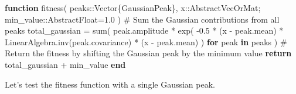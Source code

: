 \documentclass[
]{scrartcl}
\newenvironment{Shaded}{\begin{snugshade}}{\end{snugshade}}
\newcommand{\BuiltInTok}[1]{\textcolor[rgb]{0.00,0.23,0.31}{#1}}
\newcommand{\CharTok}[1]{\textcolor[rgb]{0.13,0.47,0.30}{#1}}
\newcommand{\CommentTok}[1]{\textcolor[rgb]{0.37,0.37,0.37}{#1}}
\newcommand{\ControlFlowTok}[1]{\textcolor[rgb]{0.00,0.23,0.31}{\textbf{#1}}}
\newcommand{\DataTypeTok}[1]{\textcolor[rgb]{0.68,0.00,0.00}{#1}}
\newcommand{\FloatTok}[1]{\textcolor[rgb]{0.68,0.00,0.00}{#1}}
\newcommand{\FunctionTok}[1]{\textcolor[rgb]{0.28,0.35,0.67}{#1}}
\newcommand{\KeywordTok}[1]{\textcolor[rgb]{0.00,0.23,0.31}{\textbf{#1}}}
\newcommand{\NormalTok}[1]{\textcolor[rgb]{0.00,0.23,0.31}{#1}}
\newcommand{\OperatorTok}[1]{\textcolor[rgb]{0.37,0.37,0.37}{#1}}
\begin{document}
\begin{Shaded}
\begin{Highlighting}[]
\KeywordTok{function} \FunctionTok{fitness}\NormalTok{(}
\NormalTok{    peaks}\OperatorTok{::}\DataTypeTok{Vector\{GaussianPeak\}}\NormalTok{,}
\NormalTok{    x}\OperatorTok{::}\DataTypeTok{AbstractVecOrMat}\NormalTok{;}
\NormalTok{    min\_value}\OperatorTok{::}\DataTypeTok{AbstractFloat}\NormalTok{=}\FloatTok{1.0}
\NormalTok{)}
    \CommentTok{\# Sum the Gaussian contributions from all peaks}
\NormalTok{    total\_gaussian }\OperatorTok{=} \FunctionTok{sum}\NormalTok{(}
\NormalTok{        peak.amplitude }\OperatorTok{*}
        \FunctionTok{exp}\NormalTok{(}
            \OperatorTok{{-}}\FloatTok{0.5} \OperatorTok{*}
\NormalTok{            (x }\OperatorTok{{-}}\NormalTok{ peak.mean)}\CharTok{\textquotesingle{} *}
            \BuiltInTok{LinearAlgebra}\NormalTok{.}\FunctionTok{inv}\NormalTok{(peak.covariance) }\OperatorTok{*}
\NormalTok{            (x }\OperatorTok{{-}}\NormalTok{ peak.mean)}
\NormalTok{        )}
        \ControlFlowTok{for}\NormalTok{ peak }\KeywordTok{in}\NormalTok{ peaks}
\NormalTok{    )}
    \CommentTok{\# Return the fitness by shifting the Gaussian peak by the minimum value}
    \ControlFlowTok{return}\NormalTok{ total\_gaussian }\OperatorTok{+}\NormalTok{ min\_value}
\ControlFlowTok{end}
\end{Highlighting}
\end{Shaded}

Let's test the fitness function with a single Gaussian peak.
\end{document}
